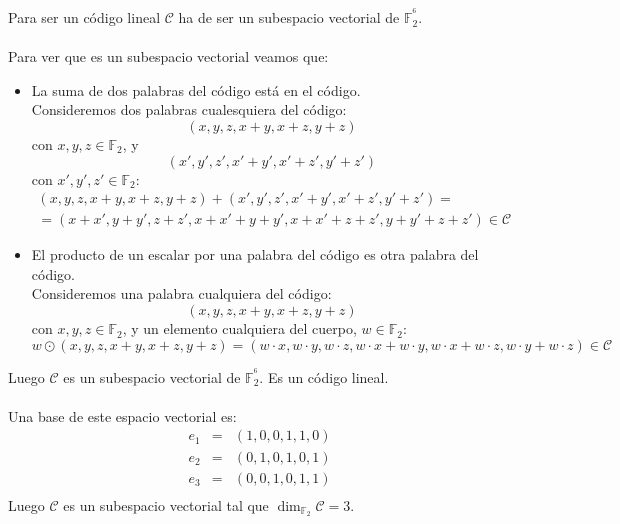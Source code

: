 Para ser un c\'odigo lineal $\mathcal{C}$ ha de ser un subespacio vectorial de
$\mathbb{F}^{^6}_2$.\\ \\
%
Para ver que es un subespacio vectorial veamos que:
\begin{itemize}
\item La suma de dos palabras del c\'odigo est\'a en el c\'odigo.\\

Consideremos dos palabras cualesquiera del c\'odigo:
\begin{displaymath}
(x,y,z,x+y,x+z,y+z)
\end{displaymath}
con $x,y,z\in \mathbb{F}_2$, y
\begin{displaymath}
(x',y',z',x'+y',x'+z',y'+z')
\end{displaymath}
con $x',y',z'\in \mathbb{F}_2$:
\begin{eqnarray*}
(x,y,z,x+y,x+z,y+z)+(x',y',z',x'+y',x'+z',y'+z') =& &\\
=(x+x',y+y',z+z',x+x'+y+y',x+x'+z+z',y+y'+z+z')\in \mathcal{C}
\end{eqnarray*}
\item El producto de un escalar por una palabra del c\'odigo es otra palabra
del c\'odigo.\\

Consideremos una palabra cualquiera del c\'odigo:
\begin{displaymath}
(x,y,z,x+y,x+z,y+z)
\end{displaymath}
con $x,y,z\in \mathbb{F}_2$, y un elemento cualquiera del cuerpo,
$w\in \mathbb{F}_2$:
\begin{displaymath}
w\odot (x,y,z,x+y,x+z,y+z) = (w\cdot x,w\cdot y,w\cdot z, w\cdot x+w\cdot y,
w\cdot x+w\cdot z,w\cdot y+w\cdot z) \in \mathcal{C}
\end{displaymath}
\end{itemize}
Luego $\mathcal{C}$ es un subespacio vectorial de $\mathbb{F}^{^6}_2$. Es un
c\'odigo lineal.\\ \\
%
Una base de este espacio vectorial es:
\begin{eqnarray*}
e_1&=&(1,0,0,1,1,0)\\
e_2&=&(0,1,0,1,0,1)\\
e_3&=&(0,0,1,0,1,1)\\
\end{eqnarray*}
Luego $\mathcal{C}$ es un subespacio vectorial tal que
$\dim_{\mathbb{F}_2}\mathcal{C}=3$.


